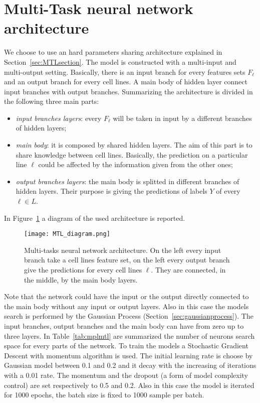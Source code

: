 \section{Multi-Task neural network architecture} \label{sec:mtlmlp}
We choose to use an hard parameters sharing architecture explained in Section~\ref{sec:MTLsection}. The model is constructed with a multi-input and multi-output setting. Basically, there is an input branch for every features sets $F_\ell$ and an output branch for every cell lines. A main body of hidden layer connect input branches with output branches. Summarizing the architecture is divided in the following three main parts:
\begin{itemize}
    \item \textit{input branches layers}: every $F_\ell$ will be taken in input by a different branches of hidden layers; 
    \item \textit{main body}: it is composed by shared hidden layers. The aim of this part is to share knowledge between cell lines. Basically, the prediction on a particular line $\ell$ could be affected by the information given from the other ones;
    \item \textit{output branches layers}: the main body is splitted in different branches of hidden layers. Their purpose is giving the predictions of labels $Y$ of every $\ell \in L$.
\end{itemize}
In Figure~\ref{fig:MTL_arch_diagram} a diagram of the used architecture is reported.
\begin{figure}[ht]
\centering
\texttt{[image: MTL\_diagram.png]}
\caption{Multi-tasks neural network architecture. On the left every input branch take a cell lines feature set, on the left every output branch give the predictions for every cell lines $\ell$. They are connected, in the middle, by the main body layers. } 
\label{fig:MTL_arch_diagram}
\end{figure}
Note that the network could have the input or the output directly connected to the main body without any input or output layers. 
Also in this case the models search is performed by the Gaussian Process
(Section~\ref{sec:gaussianprocess}). The input branches, output branches and
the main body can have from zero up to three layers. In Table~\ref{tab:mplmtl} are summarized the number of neurons search space for every parts of the network. 
To train the models a Stochastic Gradient Descent with momentum algorithm is used. The initial learning rate is choose by Gaussian model between 0.1 and 0.2 and it decay with the increasing of iterations with a 0.01 rate. The momentum and the dropout (a form of model complexity control) are set respectively to 0.5 and 0.2. Also in this case the model is iterated for 1000 epochs, the batch size is fixed to 1000 sample per batch. 
